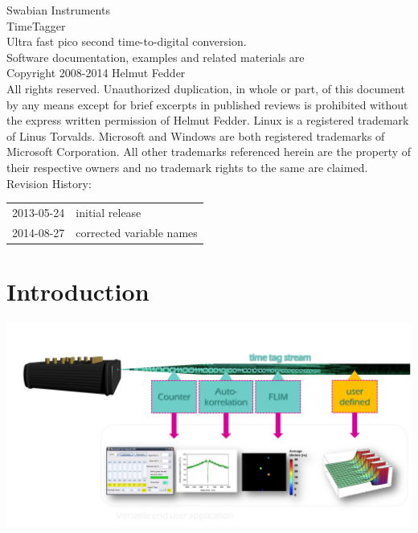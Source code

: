 \documentclass[oneside]{memoir}
\begin{document}
\lstset{language=Python}
 
 

\frontmatter
\setcounter{secnumdepth}{-1}

{\raggedleft
\hfill Swabian Instruments
}\\
TimeTagger\\
Ultra fast pico second time-to-digital conversion.
\pagebreak\\
Software documentation, examples and related materials are\\[1em]
Copyright 2008-2014 Helmut Fedder\\[1em]
All rights reserved. Unauthorized duplication, in whole or part, of this document by any means except for brief
excerpts in published reviews is prohibited without the express written permission of Helmut Fedder.
Linux is a registered trademark of Linus Torvalds. Microsoft and Windows are both registered trademarks of
Microsoft Corporation. All other trademarks referenced herein are the property of their respective owners and no
trademark rights to the same are claimed.\\[1em]
Revision History:\\
\begin{tabular}{ll}
2013-05-24 & initial release\\
2014-08-27 & corrected variable names\\
\end{tabular}
\pagebreak


\mainmatter
\setcounter{secnumdepth}{-1}

\tableofcontents

\chapter{Introduction}

\begin{center}
\includegraphics[scale=0.4]{figures/architecture.png}
\end{center}
\end{document}
